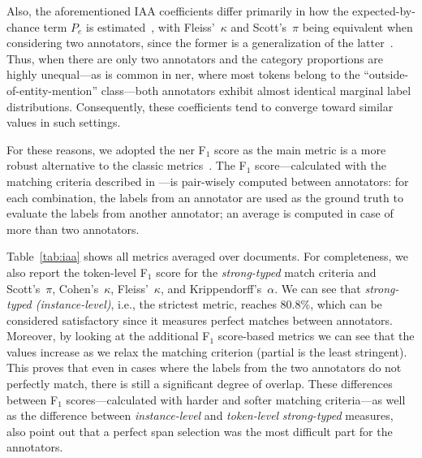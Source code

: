 Also, the aforementioned IAA coefficients differ primarily in how the expected-by-chance term $P_e$ is estimated~\cite{vanOest2019}, with Fleiss'~$\kappa$ and Scott's~$\pi$ being equivalent when considering two annotators, since the former is a generalization of the latter~\cite{HayesKrippendorff2007}. Thus, when there are only two annotators and the category proportions are highly unequal---as is common in \ac{ner}, where most tokens belong to the ``outside-of-entity-mention'' class---both annotators exhibit almost identical marginal label distributions. Consequently, these coefficients tend to converge toward similar values in such settings.

For these reasons, we adopted the \ac{ner} F$_1$ score as the main metric is a more robust alternative to the classic metrics~\cite{hripcsak2005agreement, grouin2011proposal}.
The F$_1$ score---calculated with the matching criteria described in ---is pair-wisely computed between annotators: for each combination, the labels from an annotator are used as the ground truth to evaluate the labels from another annotator; an average is computed in case of more than two annotators. 

Table~\ref{tab:iaa} shows all metrics averaged over documents. For completeness, we also report the token-level F$_1$ score for the \textit{strong-typed} match criteria and Scott's~$\pi$, Cohen's~$\kappa$, Fleiss'~$\kappa$, and Krippendorff's~$\alpha$.
We can see that \textit{strong-typed (instance-level)}, i.e., the strictest metric, reaches 80.8\%, which can be considered satisfactory since it measures perfect matches between annotators. Moreover, by looking at the additional F$_1$ score-based metrics we can see that the values increase as we relax the matching criterion (partial is the least stringent). This proves that even in cases where the labels from the two annotators do not perfectly match, there is still a significant degree of overlap.
These differences between F$_1$ scores---calculated with harder and softer matching criteria---as well as the difference between \textit{instance-level} and \textit{token-level} \textit{strong-typed} measures, also point out that a perfect span selection was the most difficult part for the annotators.

